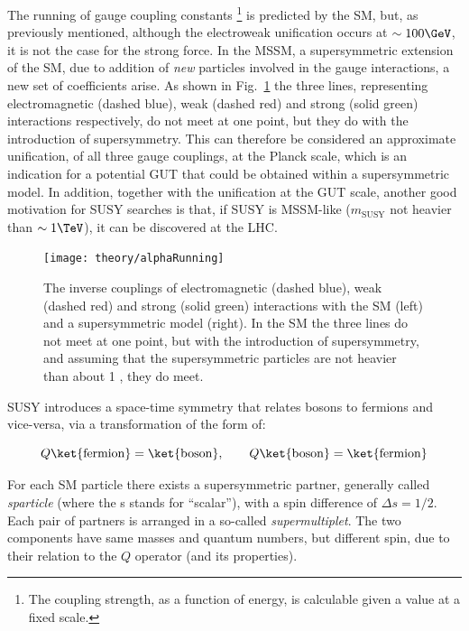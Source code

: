 		The running of gauge coupling constants \footnote{The  coupling strength, as a function of energy, is calculable given a value at a fixed scale.} is predicted by the \ac{SM}, but, as previously mentioned, although the electroweak unification occurs at $\sim 100 \GeV$, it is not the case for the strong force. In the \ac{MSSM}, a supersymmetric extension of the \ac{SM}, due to addition of \emph{new} particles involved in the gauge interactions, a new set of coefficients arise. As shown in Fig.~\ref{fig:alphaRunning} the three lines, representing electromagnetic (dashed blue), weak (dashed red) and strong (solid green) interactions respectively, do not meet at one point, but they do with the introduction of supersymmetry. This can therefore be considered an approximate unification, of all three gauge couplings, at the Planck scale, which is an indication for a potential \ac{GUT} that could be obtained within a supersymmetric model. In addition, together with the unification at the \ac{GUT} scale, another good motivation for \ac{SUSY} searches is that, if \ac{SUSY} is \ac{MSSM}-like ($m_{\mathrm{SUSY}}$ not heavier than $\sim 1 \TeV$), it can be discovered at the \ac{LHC}.  
	
		\begin{figure}[!htb]
			\centering
			\texttt{[image: theory/alphaRunning]}
			\caption{\label{fig:alphaRunning} The inverse couplings of electromagnetic (dashed blue), weak (dashed red) and strong (solid green) interactions with the \ac{SM} (left) and a supersymmetric model (right). In the \ac{SM} the three lines do not meet at one point, but with the introduction of supersymmetry, and assuming that the supersymmetric particles are not heavier than about 1 \TeV, they do meet.}
		\end{figure}		

		
		\ac{SUSY} introduces a space-time symmetry that relates bosons to fermions and vice-versa, via a transformation of the form of:  

		\begin{equation}
		\label{eq:susy_transformation}
			Q \ket{\mathrm{fermion}} = \ket{\mathrm{boson}}, \qquad Q \ket{\mathrm{boson}} = \ket{\mathrm{fermion}}
		\end{equation}

		\noindent For each \ac{SM} particle there exists a supersymmetric partner, generally called \textit{sparticle} (where the s stands for “scalar”), with a spin difference of $\Delta s = 1/2$. Each pair of partners is arranged in a so-called \textit{supermultiplet}. The two components have same masses and quantum numbers, but different spin, due to their relation to the $Q$ operator (and its properties). 

